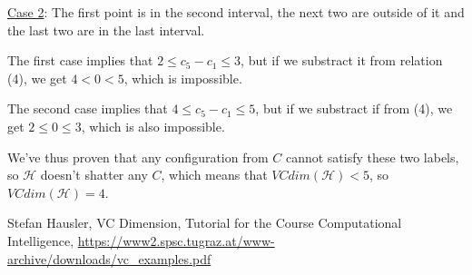 \documentclass{article}
\begin{document}
\underline{Case 2}: The first point is in the second interval, the next two are outside of it and the last two are in the last interval.  

The first case implies that $2 \leq c_5 - c_1 \leq 3$, but if we substract it from relation (4), we get $4<0<5$, which is impossible.

The second case implies that $4\leq c_5-c_1 \leq 5$, but if we substract if from (4), we get $2\leq 0\leq 3$, which is also impossible.

We've thus proven that any configuration from $C$ cannot satisfy these two labels, so $\mathcal{H}$ doesn't shatter any $C$, which means that $VCdim(\mathcal{H}) < 5$, so $VCdim(\mathcal{H})=4$.
\newpage

\begin{thebibliography}{1.7} 
	 \color{cyan}Stefan Hausler, VC Dimension, Tutorial for the Course Computational Intelligence, \url{https://www2.spsc.tugraz.at/www-archive/downloads/vc_examples.pdf} \color{black}
	
\end{thebibliography}
\end{document}
